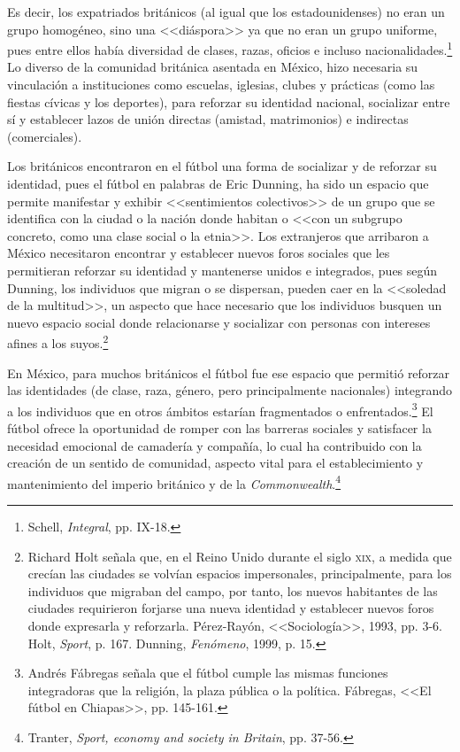 \documentclass[11pt,a5paper,twoside]{book} %
\begin{document}
Es decir, los expatriados británicos (al igual que los estadounidenses) no eran un
grupo homogéneo, sino una <<diáspora>> ya que no eran un grupo uniforme, pues entre ellos había diversidad de clases, razas, oficios e incluso nacionalidades.\footnote{Schell, \emph{Integral}, pp. IX-18.} Lo diverso de la comunidad británica asentada en México, hizo necesaria su vinculación a instituciones como escuelas, iglesias, clubes y prácticas (como las fiestas cívicas y los deportes), para reforzar su identidad nacional, socializar entre sí y establecer lazos de unión directas (amistad, matrimonios) e indirectas (comerciales).

Los británicos encontraron en el fútbol una forma de socializar y de reforzar su
identidad, pues el fútbol en palabras de Eric Dunning, ha sido un espacio que permite manifestar y exhibir <<sentimientos colectivos>> de un grupo que se identifica con la ciudad o la nación donde habitan o <<con un subgrupo concreto, como una clase social o la etnia>>. Los extranjeros que arribaron a México necesitaron encontrar y establecer nuevos foros sociales que les permitieran reforzar su identidad y mantenerse unidos e integrados, pues según Dunning, los individuos que migran o se dispersan, pueden caer en la <<soledad de la multitud>>, un aspecto que hace necesario que los individuos busquen un  nuevo espacio social donde relacionarse y socializar con personas con intereses afines a los suyos.\footnote{Richard Holt señala que, en el Reino Unido durante el siglo \textsc{xix}, a medida que crecían las ciudades se volvían espacios impersonales, principalmente, para los individuos que migraban del campo, por tanto, los nuevos habitantes de las ciudades requirieron forjarse una nueva identidad y establecer nuevos foros donde expresarla y reforzarla. Pérez-Rayón, <<Sociología>>, 1993, pp. 3-6. Holt, \emph{Sport}, p. 167. Dunning, \emph{Fenómeno}, 1999, p. 15.}

En México, para muchos británicos el fútbol fue ese espacio que permitió reforzar las identidades (de clase, raza, género, pero principalmente nacionales) integrando a los individuos que en otros ámbitos estarían fragmentados o enfrentados.\footnote{Andrés Fábregas señala que el fútbol cumple las mismas funciones integradoras que la religión, la plaza pública o la política. Fábregas, <<El fútbol en Chiapas>>, pp. 145-161.} El fútbol ofrece la oportunidad de romper con las barreras sociales y satisfacer la necesidad emocional de camadería y compañía, lo cual ha contribuido con la creación de un sentido de comunidad, aspecto vital para el establecimiento
y mantenimiento del imperio británico y de la \emph{Commonwealth}.\footnote{Tranter, \emph{Sport, economy and society in Britain}, pp. 37-56.}
\end{document}
